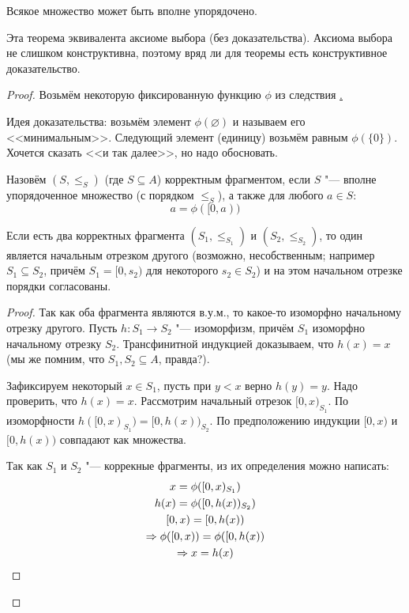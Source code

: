\begin{theorem}[Цермелло]
	Всякое множество может быть вполне упорядочено.
\end{theorem}
\begin{Rem}
	Эта теорема эквивалента аксиоме выбора (без доказательства).
	Аксиома выбора не слишком конструктивна, поэтому вряд ли для теоремы есть конструктивное доказательство.
\end{Rem}
\begin{proof}
	Возьмём некоторую фиксированную функцию $\phi$ из следствия \href{axiom_of_choice_phi}.

	Идея доказательства: возьмём элемент $\phi(\varnothing)$ и называем его <<минимальным>>.
	Следующий элемент (единицу) возьмём равным $\phi(\{ 0 \})$.
	Хочется сказать <<и так далее>>, но надо обосновать.

	\begin{Def}
		Назовём $(S, \le_S)$ (где $S \subseteq A$) корректным фрагментом,
		если $S$ "--- вполне упорядоченное множество (с порядком $\le_S$), а также для любого $a \in S$:
		\[ a = \phi([0, a)) \]
	\end{Def}
	\begin{lemma}
		Если есть два корректных фрагмента $(S_1, \le_{S_1})$ и $(S_2, \le_{S_2})$,
		то один является начальным отрезком другого (возможно, несобственным; например $S_1 \subseteq S_2$, причём
		$S_1=[0,s_2)$ для некоторого $s_2 \in S_2$) и на этом начальном отрезке порядки согласованы.
	\end{lemma}
	\begin{proof}
		Так как оба фрагмента являются в.у.м., то какое-то изоморфно начальному отрезку другого.
		Пусть $h \colon S_1 \to S_2$ "--- изоморфизм, причём $S_1$ изоморфно начальному отрезку $S_2$.
		Трансфинитной индукцией доказываем, что $h(x)=x$ (мы же помним, что $S_1, S_2 \subseteq A$, правда?).

		Зафиксируем некоторый $x \in S_1$, пусть при $y < x$ верно $h(y)=y$.
		Надо проверить, что $h(x)=x$.
		Рассмотрим начальный отрезок $[0, x)_{S_1}$.
		По изоморфности $h([0, x)_{S_1}) = [0, h(x))_{S_2}$.
		По предположению индукции $[0, x)$ и $[0, h(x))$  совпадают как множества.

		Так как $S_1$ и $S_2$ "--- коррекные фрагменты, из их определения можно написать:
		\begin{gather*}
			x = \phi([0, x)_{S_1}) \\
			h(x) = \phi([0, h(x))_{S_2})\\
			[0, x) = [0, h(x))\\
			\Rightarrow \phi([0, x)) = \phi([0, h(x)) \\
			\Rightarrow x = h(x)
		\end{gather*}
	\end{proof}


\end{proof}
